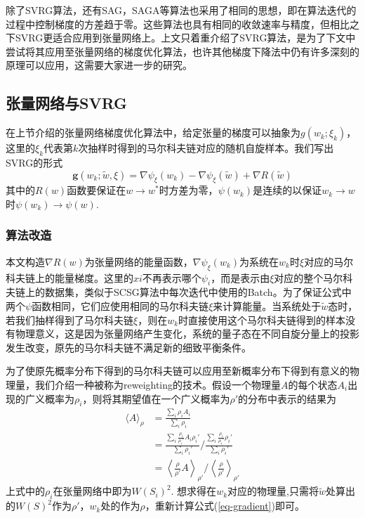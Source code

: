 除了SVRG算法，还有SAG\cite{rouxStochasticGradientMethod}，SAGA\cite{hofmannVarianceReducedStochastic2016,defazioSAGAFastIncremental2014}等算法也采用了相同的思想，即在算法迭代的过程中控制梯度的方差趋于零。这些算法也具有相同的收敛速率与精度，但相比之下SVRG更适合应用到张量网络上。上文只着重介绍了SVRG算法，是为了下文中尝试将其应用至张量网络的梯度优化算法，也许其他梯度下降法中仍有许多深刻的原理可以应用，这需要大家进一步的研究。

\subsection{张量网络与SVRG}

在上节介绍的张量网络梯度优化算法中，给定张量的梯度可以抽象为$g(w_k;\xi_k)$，这里的$\xi_k$代表第$k$次抽样时得到的马尔科夫链对应的随机自旋样本。我们写出SVRG的形式
\begin{equation}\label{key}
\symbf{g}(w_k;\tilde{w},\xi)=\nabla\psi_{\xi}(w_{k})-\nabla\psi_{\xi}(\tilde{w}) + \nabla R(\tilde{w})
\end{equation}
其中的$R(w)$函数要保证在$w\to w^*$时方差为零，$\psi(w_k)$是连续的以保证$w_k\to w$时$\psi(w_k)\to\psi(w)$. 

\subsubsection{算法改造}
本文构造$\nabla R(w)$为张量网络的能量函数，$\nabla\psi_{\xi}(w_k)$为系统在$w_k$时$\xi$对应的马尔科夫链上的能量梯度。这里的$xi$不再表示哪个$\psi_i$，而是表示由$\xi$对应的整个马尔科夫链上的数据集，类似于SCSG\cite{pmlr-v54-lei17a}算法中每次迭代中使用的Batch。为了保证公式中两个$\psi$函数相同，它们应使用相同的马尔科夫链$\xi$来计算能量。当系统处于$\tilde{w}$态时，若我们抽样得到了马尔科夫链$\xi$，则在$w_k$时直接使用这个马尔科夫链得到的样本没有物理意义，这是因为张量网络产生变化，系统的量子态在不同自旋分量上的投影发生改变，原先的马尔科夫链不满足新的细致平衡条件。

为了使原先概率分布下得到的马尔科夫链可以应用至新概率分布下得到有意义的物理量，我们介绍一种被称为reweighting的技术。假设一个物理量$A$的每个状态$A_i$出现的广义概率为$\rho_i$，则将其期望值在一个广义概率为$\rho'$的分布中表示的结果为
\begin{align*}
\langle A\rangle_\rho &= \frac{\sum_i \rho_i A_i}{\sum_i \rho_i}\\
		&= \frac{\sum_i \frac{\rho_i}{\rho_i'}A_i\rho_i'}{\sum_i \rho_i'}\Bigg/\frac{\sum_i \frac{\rho_i}{\rho_i'}\rho_i'}{\sum_i \rho_i'}\\
		&= \left\langle \frac{\rho}{\rho'}A\right\rangle_{\rho'} \Bigg/  \left\langle \frac{\rho}{\rho'}\right\rangle_{\rho'}
\end{align*}
上式中的$\rho_i$在张量网络中即为$W\!(S_i)^2$. 想求得在$w_k$对应的物理量,只需将$\tilde{w}$处算出的$W\!(S)^2$作为$\rho'$，$w_k$处的作为$\rho$，重新计算公式(\ref{eq-gradient})即可。

